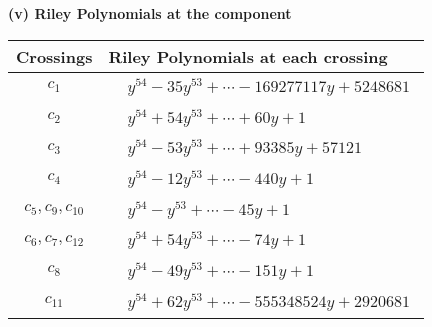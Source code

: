 \documentclass[1p]{elsarticle_modified}
\theoremstyle{definition}
\begin{document}
\newpage\renewcommand{\arraystretch}{1}
\flushleft \textbf{(v) Riley Polynomials at the component}\newline \\
\begin{tabular}{m{50pt}|m{274pt}}
Crossings & \hspace{64pt}Riley Polynomials at each crossing \\
\hline $$\begin{aligned}c_{1}\end{aligned}$$&$\begin{aligned}
&y^{54}-35 y^{53}+\cdots-169277117 y+5248681
\end{aligned}$\\
\hline $$\begin{aligned}c_{2}\end{aligned}$$&$\begin{aligned}
&y^{54}+54 y^{53}+\cdots+60 y+1
\end{aligned}$\\
\hline $$\begin{aligned}c_{3}\end{aligned}$$&$\begin{aligned}
&y^{54}-53 y^{53}+\cdots+93385 y+57121
\end{aligned}$\\
\hline $$\begin{aligned}c_{4}\end{aligned}$$&$\begin{aligned}
&y^{54}-12 y^{53}+\cdots-440 y+1
\end{aligned}$\\
\hline $$\begin{aligned}c_{5},c_{9},c_{10}\end{aligned}$$&$\begin{aligned}
&y^{54}- y^{53}+\cdots-45 y+1
\end{aligned}$\\
\hline $$\begin{aligned}c_{6},c_{7},c_{12}\end{aligned}$$&$\begin{aligned}
&y^{54}+54 y^{53}+\cdots-74 y+1
\end{aligned}$\\
\hline $$\begin{aligned}c_{8}\end{aligned}$$&$\begin{aligned}
&y^{54}-49 y^{53}+\cdots-151 y+1
\end{aligned}$\\
\hline $$\begin{aligned}c_{11}\end{aligned}$$&$\begin{aligned}
&y^{54}+62 y^{53}+\cdots-555348524 y+2920681
\end{aligned}$\\
\hline
\end{tabular}\\~\\
\end{document}
